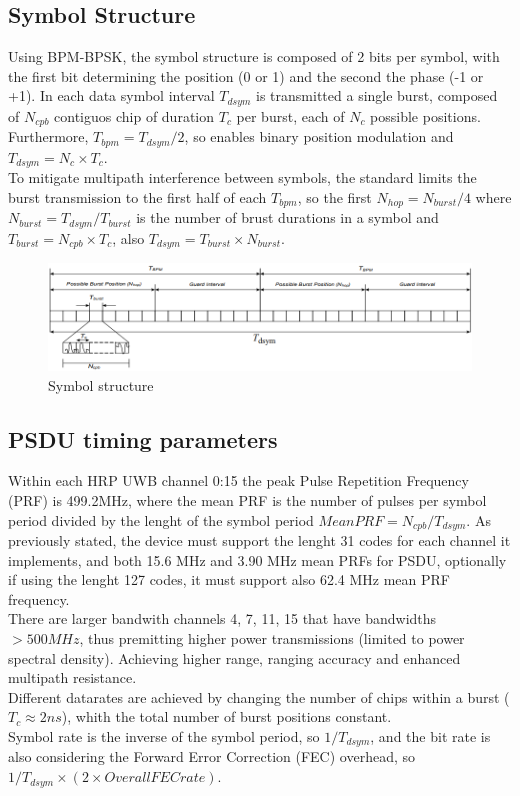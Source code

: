 \documentclass[conference]{IEEEtran}
\begin{document}
\subsection{Symbol Structure}
Using BPM-BPSK, the symbol structure is composed of 2 bits per symbol, with the first bit
determining the position (0 or 1) and the second the phase (-1 or +1). In each data symbol
interval $T_{dsym}$ is transmitted a single burst, composed of $N_{cpb}$ contiguos chip of duration $T_{c}$ per 
burst, each of $N_{c}$ possible positions. Furthermore, $T_{bpm}=T_{dsym}/2$, 
so enables binary position modulation and $T_{dsym}=N_{c} \times T_{c}$.\\
To mitigate multipath interference between symbols, the standard\cite{10794632} limits the burst transmission 
to the first half of each $T_{bpm}$, so the first $N_{hop}=N_{burst}/4$ where 
$N_{burst}=T_{dsym}/T_{burst}$ is the number of brust durations in a symbol and 
$T_{burst}=N_{cpb} \times T_{c}$, also $T_{dsym}=T_{burst} \times N_{burst}$.\\

\begin{figure}[!h]
  \centering
  \includegraphics[width=\linewidth]{symbol-structure}
  \caption{Symbol structure}
  \label{fig:symbol-structure}
\end{figure}

\subsection{PSDU timing parameters}
Within each HRP UWB channel {0:15} the peak Pulse Repetition Frequency (PRF) is 499.2MHz,
where the mean PRF is the number of pulses per symbol period divided by the lenght of the
symbol period $Mean PRF = N_{cpb}/T_{dsym}$.
As previously stated, the device must support the lenght 31 codes for each channel it
implements, and both 15.6 MHz and 3.90 MHz mean PRFs for PSDU, optionally if using the
lenght 127 codes, it must support also 62.4 MHz mean PRF frequency.\\
There are larger bandwith channels {4, 7, 11, 15} that
have bandwidths $>500MHz$, thus premitting higher power
transmissions (limited to power spectral density). Achieving higher range, ranging accuracy 
and enhanced multipath resistance.\\
Different datarates are achieved by changing the number of chips within a burst 
($T_{c}\approx2ns$), whith the total number of burst positions constant.\\
Symbol rate is the inverse of the symbol period, so $1/T_{dsym}$, and the bit rate is also
considering the Forward Error Correction (FEC) overhead, so 
$1/T_{dsym}\times(2 \times Overall FEC rate)$.\\
\end{document}
